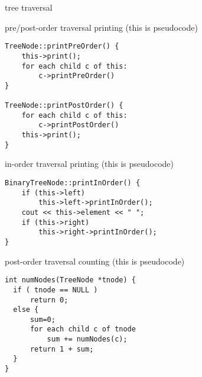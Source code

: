 
\usetikzlibrary{graphs}
\usetikzlibrary{graphdrawing}

\begin{frame}{tree traversal}
\end{frame}

\begin{frame}[fragile,label=prePostPrint]{pre/post-order traversal printing}
\lstset{language=C++,style=small}
(this is pseudocode)
\begin{lstlisting}
TreeNode::printPreOrder() {
    this->print();
    for each child c of this:
        c->printPreOrder()
}

TreeNode::printPostOrder() {
    for each child c of this:
        c->printPostOrder()
    this->print();
}
\end{lstlisting}
\end{frame}

\begin{frame}[fragile,label=inPrint]{in-order traversal printing}
\lstset{language=C++,style=small}
(this is pseudocode)
\begin{lstlisting}
BinaryTreeNode::printInOrder() {
    if (this->left)
        this->left->printInOrder();
    cout << this->element << " ";
    if (this->right)
        this->right->printInOrder();
}
\end{lstlisting}
\end{frame}

\begin{frame}[fragile,label=nonPrintTrav]{post-order traversal counting}
\lstset{language=C++,style=small}
(this is pseudocode)
\begin{lstlisting}
int numNodes(TreeNode *tnode) {
  if ( tnode == NULL )
      return 0;
  else {
      sum=0;
      for each child c of tnode
          sum += numNodes(c);
      return 1 + sum;
  }
}
\end{lstlisting}
\end{frame}
